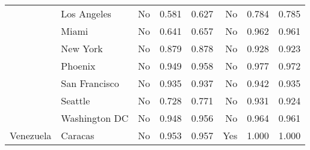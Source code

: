 \begin{tabular}{ l l r r r r r r  }
	& Los Angeles &       No &  0.581 &  0.627 &       No &  0.784 &  0.785 \\
	& Miami &       No &  0.641 &  0.657 &       No &  0.962 &  0.961 \\
	& New York &       No &  0.879 &  0.878 &       No &  0.928 &  0.923 \\
	& Phoenix &       No &  0.949 &  0.958 &       No &  0.977 &  0.972 \\
	& San Francisco &       No &  0.935 &  0.937 &       No &  0.942 &  0.935 \\
	& Seattle &       No &  0.728 &  0.771 &       No &  0.931 &  0.924 \\
	& Washington DC &       No &  0.948 &  0.956 &       No &  0.964 &  0.961 \\
	Venezuela & Caracas &       No &  0.953 &  0.957 &      Yes &  1.000 &  1.000 \\
	\bottomrule
\end{tabular}